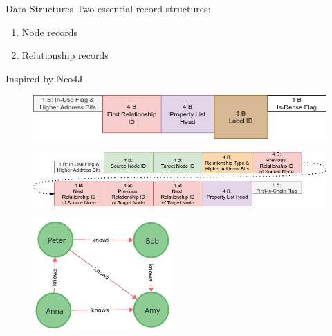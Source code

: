 \documentclass[rgb]{beamer}
\begin{document}
         \begin{frame}[allowframebreaks]{Data Structures}
            Two essential record structures: \\ [2em]
            \begin{enumerate}
            \item Node records \\ [2em]
            \item Relationship records \\ [3em]
            \end{enumerate}
            Inspired by Neo4J
            
            \framebreak
            \begin{figure}
                \begin{center}
                \includegraphics[keepaspectratio, height=\textheight, width=\textwidth]{img/node_record.png}
                \end{center}
            \end{figure}
            
            \framebreak
            \begin{figure}
                \begin{center}
                \includegraphics[keepaspectratio, height=\textheight, width=\textwidth]{img/relationship_record.png}
                \end{center}
            \end{figure}
            
            \framebreak
            \begin{figure}
                \begin{center}
                \includegraphics[keepaspectratio, height=0.6\textheight, width=.6\textwidth]{img/graph.png}
                \end{center}
            \end{figure}
            \end{frame}
            
\end{document}
